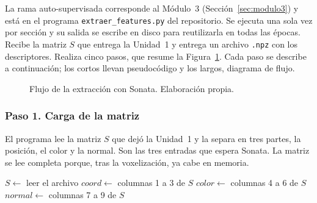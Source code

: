 La rama auto-supervisada corresponde al Módulo~3 (Sección~\ref{sec:modulo3}) y
está en el programa \texttt{extraer\_features.py} del repositorio. Se ejecuta una
sola vez por sección y su salida se escribe en disco para reutilizarla en todas
las épocas. Recibe la matriz $S$ que entrega la Unidad~1 y entrega un archivo
\texttt{.npz} con los descriptores. Realiza cinco pasos, que resume la
Figura~\ref{fig:flujo-sonata}. Cada paso se describe a continuación; los cortos
llevan pseudocódigo y los largos, diagrama de flujo.

\begin{figure}[!htbp]
\centering
{}
\caption[Flujo de la extracción con Sonata]{Flujo de la extracción con Sonata. Elaboración propia.}
\label{fig:flujo-sonata}
\end{figure}

\FloatBarrier
\subsubsection*{Paso 1. Carga de la matriz}
\label{sec:u2-p1}

El programa lee la matriz $S$ que dejó la Unidad~1 y la separa en tres partes,
la posición, el color y la normal. Son las tres entradas que espera Sonata. La
matriz se lee completa porque, tras la voxelización, ya cabe en memoria.

\begin{algorithm}[H]
\small
\caption{Paso 1 del Módulo~3, carga de la matriz.}
$S \leftarrow$ leer el archivo\;
$\mathit{coord} \leftarrow$ columnas 1 a 3 de $S$\;
$\mathit{color} \leftarrow$ columnas 4 a 6 de $S$\;
$\mathit{normal} \leftarrow$ columnas 7 a 9 de $S$\;
\end{algorithm}

